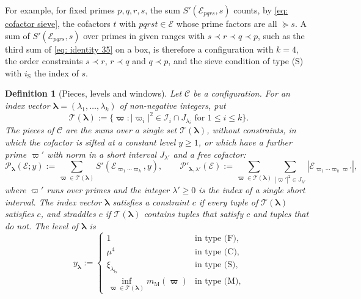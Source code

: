 \documentclass{article}
\numberwithin{equation}{section}
\newtheorem{definition}{Definition}
\newcommand{\Le}{\leqslant}
\newcommand{\Ge}{\geqslant}
\begin{document}
For example, for fixed primes $p, q, r, s$, the sum $S'(\mathcal{E}_{pqrs}, s)$ counts, by \eqref{eq: cofactor sieve}, the cofactors $t$ with $pqrst \in \mathcal{E}$ whose prime factors are all $\succcurlyeq s$. A sum of $S'(\mathcal{E}_{pqrs}, s)$ over primes in given ranges with $s \prec r \prec q \prec p$, such as the third sum of \eqref{eq: identity 35} on a box, is therefore a configuration with $k = 4$, the order constraints $s \prec r$, $r \prec q$ and $q \prec p$, and the sieve condition of type (S) with $i_{\mathrm{S}}$ the index of $s$.

\begin{definition}[Pieces, levels and windows]
\label{def: pieces}
Let $\mathcal{C}$ be a configuration. For an \emph{index vector} $\boldsymbol{\lambda} = (\lambda_1, \dots, \lambda_k)$ of non-negative integers, put
\begin{equation}
\label{eq: tuple set}
\mathcal{T}(\boldsymbol{\lambda}) := \bigl\{ \boldsymbol{\varpi} : |\varpi_i|^2 \in \mathcal{I}_i \cap J_{\lambda_i} \text{ for } 1 \Le i \Le k \bigr\}.
\end{equation}
The \emph{pieces} of $\mathcal{C}$ are the sums over a single set $\mathcal{T}(\boldsymbol{\lambda})$, without constraints, in which the cofactor is sifted at a constant level $y \Ge 1$, or which have a further prime $\varpi'$ with norm in a short interval $J_{\lambda'}$ and a free cofactor:
\begin{equation}
\label{eq: pieces}
\mathcal{P}_{\boldsymbol{\lambda}}(\mathcal{E}; y) := \sum_{\boldsymbol{\varpi} \in \mathcal{T}(\boldsymbol{\lambda})} S'(\mathcal{E}_{\varpi_1 \cdots \varpi_k}, y), \qquad \mathcal{P}'_{\boldsymbol{\lambda},\lambda'}(\mathcal{E}) := \sum_{\boldsymbol{\varpi} \in \mathcal{T}(\boldsymbol{\lambda})} \sum_{|\varpi'|^2 \in J_{\lambda'}} |\mathcal{E}_{\varpi_1 \cdots \varpi_k \varpi'}|,
\end{equation}
where $\varpi'$ runs over primes and the integer $\lambda' \Ge 0$ is the index of a single short interval. The index vector $\boldsymbol{\lambda}$ \emph{satisfies} a constraint $c$ if every tuple of $\mathcal{T}(\boldsymbol{\lambda})$ satisfies $c$, and \emph{straddles} $c$ if $\mathcal{T}(\boldsymbol{\lambda})$ contains tuples that satisfy $c$ and tuples that do not. The \emph{level} of $\boldsymbol{\lambda}$ is
\begin{equation}
\label{eq: piece level}
y_{\boldsymbol{\lambda}} := \begin{cases} 1 & \text{in type (F)}, \\ \mu^4 & \text{in type (C)}, \\ \xi_{\lambda_{i_{\mathrm{S}}}} & \text{in type (S)}, \\ \inf_{\boldsymbol{\varpi} \in \mathcal{T}(\boldsymbol{\lambda})} m_{\mathrm{M}}(\boldsymbol{\varpi}) & \text{in type (M)}, \end{cases}

\end{equation}
\end{definition}
\end{document}
